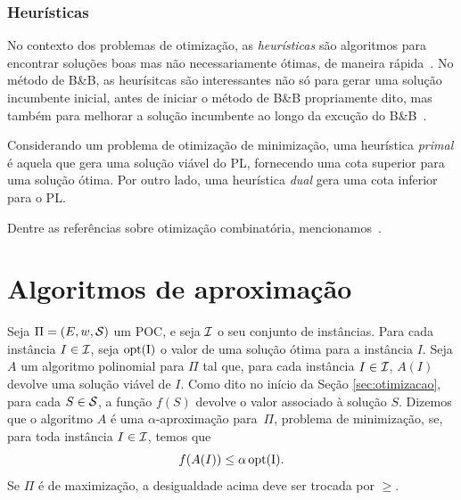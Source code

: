 \subsubsection{Heurísticas}
No contexto dos problemas de otimização, as \emph{heurísticas} são
algoritmos para encontrar soluções boas mas não necessariamente ótimas,
de maneira rápida~\cite{NemhauserW1999}. No método de B\&B, as heurísitcas
são interessantes  não só para gerar uma solução incumbente inicial, antes
de iniciar o método de B\&B propriamente dito, mas também para melhorar
a solução incumbente ao longo da excução do
B\&B~\cite{NemhauserW1999,MorrisonJSS2016}.

Considerando um problema de otimização de minimização, uma heurística
\emph{primal} é aquela que gera uma solução viável do PL,
fornecendo uma cota superior para uma solução ótima.
Por outro lado, uma heurística \emph{dual} gera uma cota inferior para o PL.

Dentre as referências sobre otimização combinatória, mencionamos~\cite{Wolsey1998,BarnhartJNSV1998,NemhauserW1999,DesrosiersL2005,MorrisonJSS2016}.

\section{Algoritmos de aproximação}
Seja $\Pi = (E, w, \mathcal{S})$ um POC, e seja $\mathcal{I}$ o seu conjunto de instâncias.  Para cada instância $I \in \mathcal{I}$, seja $\rm{opt}(I)$ o valor de uma solução ótima para a instância $I$.
Seja $A$ um algoritmo polinomial para $\Pi$ tal que, para cada instância $I \in \mathcal{I}$, $A(I)$ devolve uma solução viável de $I$.  Como dito no início da Seção \ref{sec:otimizacao}, para cada $S \in \mathcal{S}$, a função $f(S)$ devolve o valor associado à solução $S$.  Dizemos que o algoritmo $A$ é uma $\alpha$-aproximação para~$\Pi$,  problema de minimização, se, para toda instância $I \in \mathcal{I}$, temos que 
       $$f(A(I)) \leq  \alpha\,\rm{opt}(I).$$
Se $\Pi$ é de maximização, a desigualdade acima deve ser trocada por $\geq$.


